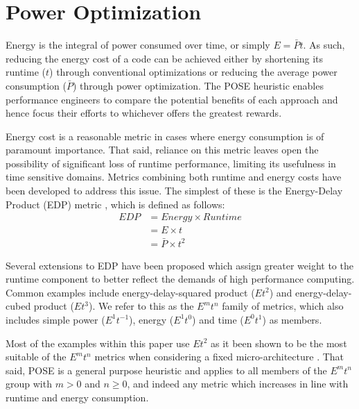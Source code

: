 \section{Power Optimization}
\label{sec:optimization}

Energy is the integral of power consumed over time, or simply $E = \bar{P}t$.
As such, reducing the energy cost of a code can be achieved either by shortening its runtime ($t$) through conventional optimizations or reducing the average power consumption ($\bar{P}$) through power optimization.
The POSE heuristic enables performance engineers to compare the potential benefits of each approach and hence focus their efforts to whichever offers the greatest rewards.

Energy cost is a reasonable metric in cases where energy consumption is of paramount importance.
That said, reliance on this metric leaves open the possibility of significant loss of runtime performance, limiting its usefulness in time sensitive domains.
Metrics combining both runtime and energy costs have been developed to address this issue. 
The simplest of these is the Energy-Delay Product (EDP) metric \cite{gonzales:1995aa}, which is defined as follows:
\begin{align}
  EDP &= Energy \times Runtime \nonumber \\
      &= E \times t \nonumber \\
      &= \bar{P} \times t^2
  \label{eq:edp}
\end{align}

Several extensions to EDP have been proposed which assign greater weight to the runtime component to better reflect the demands of high performance computing.
Common examples include energy-delay-squared product ($Et^{2}$) and energy-delay-cubed product ($Et^{3}$).
We refer to this as the $E^mt^n$ family of metrics, which also includes simple power ($E^1t^{-1}$), energy ($E^1t^0$) and time ($E^0t^1$) as members.

Most of the examples within this paper use $Et^2$ as it been shown to be the most suitable of the $E^mt^n$ metrics when considering a fixed micro-architecture \cite{brooks:2000aa}.
That said, POSE is a general purpose heuristic and applies to all members of the $E^mt^n$ group with $m > 0$ and $n \geq 0$, and indeed any metric which increases in line with runtime and energy consumption.
